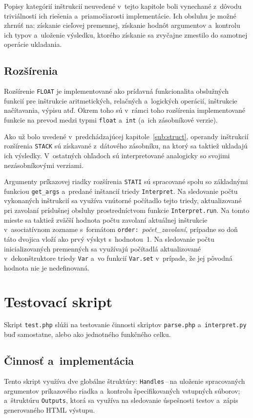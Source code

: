 \documentclass[a4paper, 10pt, twocolumn]{article}
\begin{document}
        Popisy kategórií inštrukcií neuvedené v~tejto kapitole boli vynechané z~dôvodu triviálnosti ich riešenia a~priamočiarosti implementácie. Ich obsluhu je možné zhrnúť na: získanie cieľovej premennej, získanie hodnôt argumentov a~kontrolu ich typov a~uloženie výsledku, ktorého získanie sa zvyčajne zmestilo do samotnej operácie ukladania.
    
    \subsection{Rozšírenia}
        Rozšírenie \texttt{FLOAT} je implementované ako prídavná funkcionalita obslužných funkcií pre inštrukcie aritmetických, relačných a~logických operácií, inštrukcie načítavania, výpisu atď. Okrem toho sú v~rámci toho rozšírenia implementované funkcie na prevod medzi typmi \texttt{float} a~\texttt{int} (a~ich zásobníkové verzie).
        
        Ako už bolo uvedené v~predchádzajúcej kapitole~\ref{sub:struct}, operandy inštrukcií rozšírenia \texttt{STACK} sú získavané z~dátového zásobníku, na ktorý sa taktiež ukladajú ich výsledky. V~ostatných ohľadoch sú interpretované analogicky so svojimi nezásobníkovými verziami.
        
        Argumenty príkazovej riadky rozšírenia \texttt{STATI} sú spracované spolu so základnými funkciou \texttt{get\_args} a~predané inštancií triedy \texttt{Interpret}. Na sledovanie počtu vykonaných inštrukcií sa využíva vnútorné počítadlo tejto triedy, aktualizované pri zavolaní príslušnej obsluhy prostredníctvom funkcie \texttt{Interpret.run}. Na tomto mieste sa taktiež zväčší hodnota počtu zavolaní aktuálnej inštrukcie v~asociatívnom zozname s~formátom \texttt{order:}~\textit{počet\_zavolaní}, prípadne so doň táto dvojica vloží ako prvý výskyt s~hodnotou~1. Na sledovanie počtu inicializovaných premenných sa využívajú počítadlá aktualizované v~dekonštruktore triedy \texttt{Var} a~vo funkcií \texttt{Var.set} v~prípade, že jej pôvodná hodnota nie je nedefinovaná.

\section{Testovací skript}
    Skript \texttt{test.php} slúži na testovanie činnosti skriptov \texttt{parse.php} a~\texttt{interpret.py} buď samostatne, alebo ako jednotného funkčného celku.
    
    \subsection{Činnosť a~implementácia}
        Tento skript využíva dve globálne štruktúry: \mbox{\texttt{Handles}\,--\,na} uloženie spracovaných argumentov príkazového riadka a~kontrolu špecifikovaných vstupných súborov; a~štruktúru \texttt{Outputs}, ktorá sa využíva na sledovanie úspešnosti testov a~zápis generovaného HTML výstupu.
        
\end{document}
